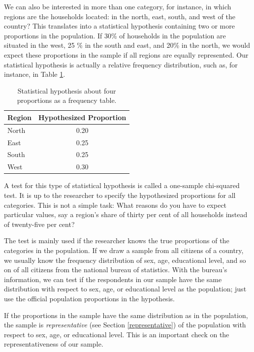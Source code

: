 \documentclass[a4paper]{book}
\theoremstyle{definition}
\theoremstyle{definition}
\theoremstyle{definition}
\theoremstyle{remark}
\begin{document}
We can also be interested in more than one category, for instance, in
which regions are the households located: in the north, east, south, and
west of the country? This translates into a statistical hypothesis
containing two or more proportions in the population. If 30\% of
households in the population are situated in the west, 25 \% in the
south and east, and 20\% in the north, we would expect these proportions
in the sample if all regions are equally represented. Our statistical
hypothesis is actually a relative frequency distribution, such as, for
instance, in Table \ref{tab:hypo-freq}.

\begin{table}

\caption{\label{tab:hypo-freq}Statistical hypothesis about four proportions as a frequency table.}
\centering
\fontsize{8}{8}\selectfont
\begin{tabular}[t]{lc}
\hline
Region & Hypothesized Proportion\\
\hline
North & 0.20\\
East & 0.25\\
South & 0.25\\
West & 0.30\\
\hline
\end{tabular}
\end{table}

A test for this type of statistical hypothesis is called a one-sample
chi-squared test. It is up to the researcher to specify the hypothesized
proportions for all categories. This is not a simple task: What reasons
do you have to expect particular values, say a region's share of thirty
per cent of all households instead of twenty-five per cent?

The test is mainly used if the researcher knows the true proportions of
the categories in the population. If we draw a sample from all citizens
of a country, we usually know the frequency distribution of sex, age,
educational level, and so on of all citizens from the national bureau of
statistics. With the bureau's information, we can test if the
respondents in our sample have the same distribution with respect to
sex, age, or educational level as the population; just use the official
population proportions in the hypothesis.

If the proportions in the sample have the same distribution as in the
population, the sample is \emph{representative} (see Section
\ref{representative}) of the population with respect to sex, age, or
educational level. This is an important check on the representativeness
of our sample.
\end{document}
